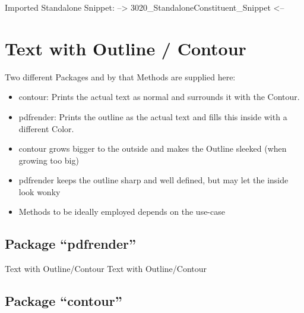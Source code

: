 \np
Imported Standalone Snippet: -->
{3020_StandaloneConstituent_Snippet}
<--


\section{Text with Outline / Contour}
Two different Packages and by that Methods are supplied here:
\begin{itemize}
	\item contour: Prints the actual text as normal and surrounds it with the Contour.
	\item pdfrender: Prints the outline as the actual text and fills this inside with a different Color.
\end{itemize}

\begin{itemize}[labpragA]
	\item contour grows bigger to the outside and makes the Outline sleeked (when growing too big)
	\item pdfrender keeps the outline sharp and well defined, but may let the inside look wonky
\end{itemize}

\begin{itemize}[labpragB]
	\item Methods to be ideally employed depends on the use-case
\end{itemize}

\subsection{Package \enquote{pdfrender}}
{%
	\Huge%
	\sffamily%
	{Text with Outline/Contour}\nl%
	{Text with Outline/Contour}%
}%

\subsection{Package \enquote{contour}}
{%
	\LARGE%
	\contourlength{\DenKrOutlineWidth}%
	\nl%
	{%
		\contourlength{0.2em}%
		\nl%
	}%
}%


